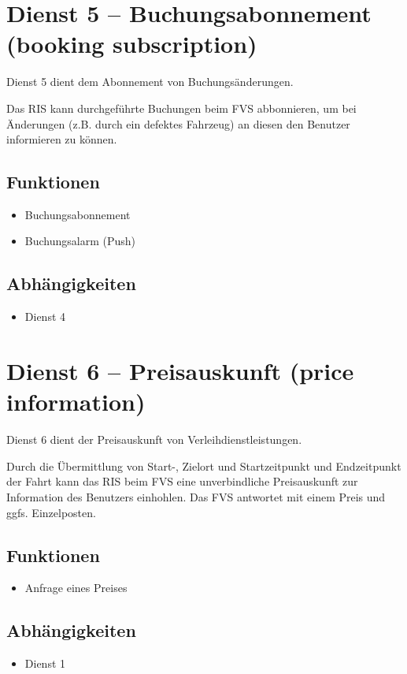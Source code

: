 \section{Dienst 5 -- Buchungsabonnement (booking subscription)}
Dienst 5 dient dem Abonnement von Buchungsänderungen.

Das RIS kann durchgeführte Buchungen beim FVS abbonnieren, um bei Änderungen (z.B. durch ein defektes Fahrzeug) an diesen den Benutzer informieren zu können.
\subsection*{Funktionen}
\begin{itemize}
\item Buchungsabonnement
\item Buchungsalarm (Push)
\end{itemize}

\subsection*{Abhängigkeiten}
\begin{itemize}
\item Dienst 4
\end{itemize}

\section{Dienst 6 -- Preisauskunft (price information)}
Dienst 6 dient der Preisauskunft von Verleihdienstleistungen. 

Durch die Übermittlung von Start-, Zielort und Startzeitpunkt und Endzeitpunkt der Fahrt kann das RIS beim FVS eine unverbindliche Preisauskunft zur Information des Benutzers einhohlen. Das FVS antwortet mit einem Preis und ggfs. Einzelposten.

\subsection*{Funktionen}
\begin{itemize}
\item Anfrage eines Preises
\end{itemize}

\subsection*{Abhängigkeiten}
\begin{itemize}
\item Dienst 1
\end{itemize}


